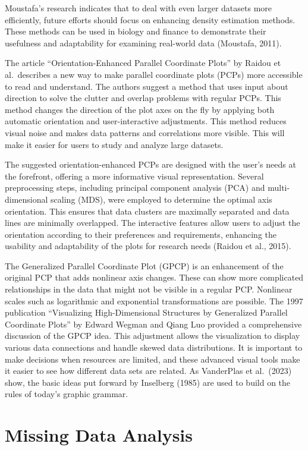 \documentclass[print]{nuthesis}
\begin{document}
Moustafa's research indicates that to deal with even larger datasets more efficiently, future efforts should focus on enhancing density estimation methods.
These methods can be used in biology and finance to demonstrate their usefulness and adaptability for examining real-world data (Moustafa, 2011).

The article ``Orientation-Enhanced Parallel Coordinate Plots'' by Raidou et al.~describes a new way to make parallel coordinate plots (PCPs) more accessible to read and understand.
The authors suggest a method that uses input about direction to solve the clutter and overlap problems with regular PCPs.
This method changes the direction of the plot axes on the fly by applying both automatic orientation and user-interactive adjustments.
This method reduces visual noise and makes data patterns and correlations more visible.
This will make it easier for users to study and analyze large datasets.

The suggested orientation-enhanced PCPs are designed with the user's needs at the forefront, offering a more informative visual representation.
Several preprocessing steps, including principal component analysis (PCA) and multi-dimensional scaling (MDS), were employed to determine the optimal axis orientation.
This ensures that data clusters are maximally separated and data lines are minimally overlapped.
The interactive features allow users to adjust the orientation according to their preferences and requirements, enhancing the usability and adaptability of the plots for research needs (Raidou et al., 2015).

The Generalized Parallel Coordinate Plot (GPCP) is an enhancement of the original PCP that adds nonlinear axis changes.
These can show more complicated relationships in the data that might not be visible in a regular PCP.
Nonlinear scales such as logarithmic and exponential transformations are possible.
The 1997 publication ``Visualizing High-Dimensional Structures by Generalized Parallel Coordinate Plots'' by Edward Wegman and Qiang Luo provided a comprehensive discussion of the GPCP idea.
This adjustment allows the visualization to display various data connections and handle skewed data distributions.
It is important to make decisions when resources are limited, and these advanced visual tools make it easier to see how different data sets are related.
As VanderPlas et al.~(2023) show, the basic ideas put forward by Inselberg (1985) are used to build on the rules of today's graphic grammar.

\hypertarget{missing-data-analysis}{%
\section{Missing Data Analysis}\label{missing-data-analysis}}
\end{document}
